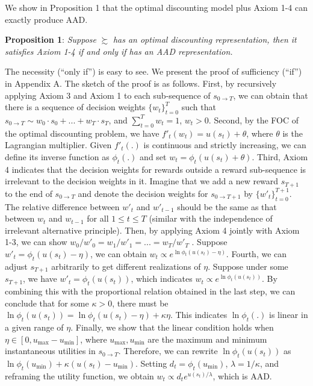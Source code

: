 \documentclass[
  12pt,
]{article}
\begin{document}
We show in Proposition 1 that the optimal discounting model plus Axiom
1-4 can exactly produce AAD.

\noindent \textbf{Proposition 1}: \emph{Suppose} \(\succsim\) \emph{has
an optimal discounting representation, then it satisfies Axiom 1-4 if
and only if has an AAD representation.}

The necessity (``only if'') is easy to see. We present the proof of
sufficiency (``if'') in Appendix A. The sketch of the proof is as
follows. First, by recursively applying Axiom 3 and Axiom 1 to each
sub-sequence of \(s_{0\rightarrow T}\), we can obtain that there is a
sequence of decision weights \(\{w_t\}_{t=0}^T\) such that
\(s_{0\rightarrow T}\sim w_0\cdot s_0+...+w_T\cdot s_T\), and
\(\sum_{t=0}^T w_t = 1\), \(w_t>0\). Second, by the FOC of the optimal
discounting problem, we have \(f'_t(w_t)=u(s_t)+\theta\), where
\(\theta\) is the Lagrangian multiplier. Given \(f'_t(.)\) is continuous
and strictly increasing, we can define its inverse function as
\(\phi_t(.)\) and set \(w_t=\phi_t(u(s_t)+\theta)\). Third, Axiom 4
indicates that the decision weights for rewards outside a reward
sub-sequence is irrelevant to the decision weights in it. Imagine that
we add a new reward \(s_{T+1}\) to the end of \(s_{0\rightarrow T}\) and
denote the decision weights for \(s_{0\rightarrow T+1}\) by
\(\{w'_t\}_{t=0}^{T+1}\). The relative difference between \(w'_t\) and
\(w'_{t-1}\) should be the same as that between \(w_t\) and \(w_{t-1}\)
for all \(1\leq t\leq T\) (similar with the independence of irrelevant
alternative principle). Then, by applying Axiom 4 jointly with Axiom
1-3, we can show \(w_0/w'_0=w_1/w'_1=...=w_T/w'_T\) . Suppose
\(w'_t=\phi_t(u(s_t)-\eta)\), we can obtain
\(w_t \propto e^{\ln\phi_t(u(s_t)-\eta)}\). Fourth, we can adjust
\(s_{T+1}\) arbitrarily to get different realizations of \(\eta\).
Suppose under some \(s_{T+1}\), we have \(w'_t = \phi_t(u(s_t))\), which
indicates \(w_t \propto e^{\ln\phi_t(u(s_t))}\). By combining this with
the proportional relation obtained in the last step, we can conclude
that for some \(\kappa>0\), there must be
\(\ln\phi_t(u(s_t))=\ln\phi_t(u(s_t)-\eta)+\kappa\eta\). This indicates
\(\ln \phi_t(.)\) is linear in a given range of \(\eta\). Finally, we
show that the linear condition holds when
\(\eta\in[0,u_{\max}-u_{\min}]\), where \(u_{\max},u_{\min}\) are the
maximum and minimum instantaneous utilities in \(s_{0\rightarrow T}\).
Therefore, we can rewrite \(\ln\phi_t(u(s_t))\) as
\(\ln\phi_t(u_{\min})+\kappa(u(s_t)-u_{\min})\). Setting
\(d_t=\phi_t(u_{\min})\), \(\lambda =1/\kappa\), and reframing the
utility function, we obtain \(w_t \propto d_t e^{u(s_t)/\lambda}\),
which is AAD.
\end{document}
